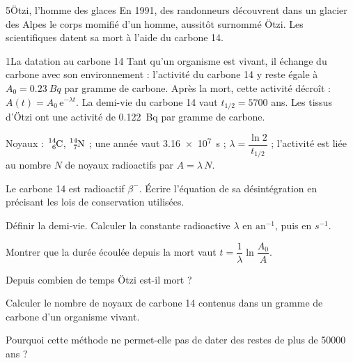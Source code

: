 \begin{exoBac}{5}{Ötzi, l'homme des glaces}
En 1991, des randonneurs découvrent dans un glacier des Alpes le corps momifié d'un homme, aussitôt surnommé Ötzi. Les
scientifiques datent sa mort à l'aide du carbone 14.
\begin{docu}{1}{La datation au carbone 14}
Tant qu'un organisme est vivant, il échange du carbone avec son environnement : l'activité du carbone 14 y reste égale
à $A_0=\qty{0,23}{Bq}$ par gramme de carbone. Après la mort, cette activité décroît : $A(t)=A_0\,\mathrm{e}^{-\lambda t}$. La demi-vie du
carbone 14 vaut $t_{1/2}=\num{5700}$ ans. Les tissus d'Ötzi ont une activité de \qty{0,122}{Bq} par gramme de carbone.
\end{docu}
\begin{donnees}
Noyaux : $\ce{^{14}_{6}C}$, $\ce{^{14}_{7}N}$ ; une année vaut \qty{3,16e7}{s} ; $\lambda=\dfrac{\ln2}{t_{1/2}}$ ; l'activité est liée au nombre $N$ de noyaux
radioactifs par $A=\lambda\,N$.
\end{donnees}
\begin{questions}
\item Le carbone 14 est radioactif $\beta^-$. Écrire l'équation de sa désintégration en précisant les lois de conservation
utilisées.
\item Définir la demi-vie. Calculer la constante radioactive $\lambda$ en $\text{an}^{-1}$, puis en $\unit{s^{-1}}$.
\item Montrer que la durée écoulée depuis la mort vaut $t=\dfrac{1}{\lambda}\ln\dfrac{A_0}{A}$.
\item \initiative Depuis combien de temps Ötzi est-il mort ?
\item Calculer le nombre de noyaux de carbone 14 contenus dans un gramme de carbone d'un organisme vivant.
\item Pourquoi cette méthode ne permet-elle pas de dater des restes de plus de \num{50000} ans ?
\end{questions}
\end{exoBac}
